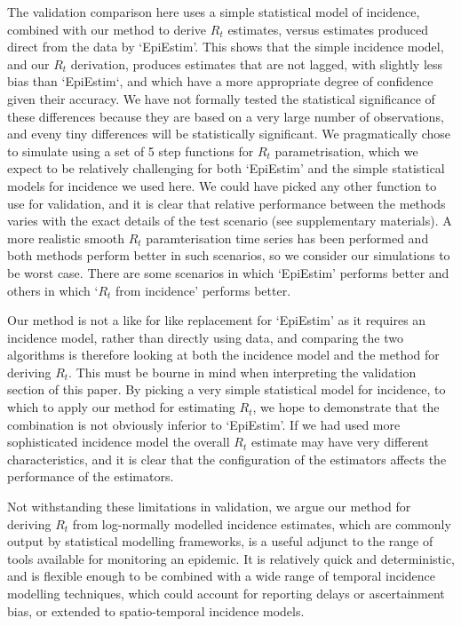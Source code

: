 \documentclass[10pt,letterpaper]{article}
\begin{document}
The validation comparison here uses a simple statistical model of incidence, combined with our method to derive $R_t$ estimates, versus estimates produced direct from the data by `EpiEstim'. This shows that the simple incidence model, and our $R_t$ derivation, produces estimates that are not lagged, with slightly less bias than `EpiEstim`, and which have a more appropriate degree of confidence given their accuracy. We have not formally tested the statistical significance of these differences because they are based on a very large number of observations, and eveny tiny differences will be statistically significant. We pragmatically chose to simulate using a set of 5 step functions for $R_t$ parametrisation, which we expect to be relatively challenging for both `EpiEstim' and the simple statistical models for incidence we used here. We could have picked any other function to use for validation, and it is clear that relative performance between the methods varies with the exact details of the test scenario (see supplementary materials). A more realistic smooth $R_t$ paramterisation time series has been performed and both methods perform better in such scenarios, so we consider our simulations to be worst case. There are some scenarios in which `EpiEstim' performs better and others in which `$R_t$ from incidence' performs better.

Our method is not a like for like replacement for `EpiEstim' as it requires an incidence model, rather than directly using data, and comparing the two algorithms is therefore looking at both the incidence model and the method for deriving $R_t$. This must be bourne in mind when interpreting the validation section of this paper. By picking a very simple statistical model for incidence, to which to apply our method for estimating $R_t$, we hope to demonstrate that the combination is not obviously inferior to `EpiEstim'. If we had used more sophisticated incidence model the overall $R_t$ estimate may have very different characteristics, and it is clear that the configuration of the estimators affects the performance of the estimators.

Not withstanding these limitations in validation, we argue our method for deriving $R_t$ from log-normally modelled incidence estimates, which are commonly output by statistical modelling frameworks, is a useful adjunct to the range of tools available for monitoring an epidemic. It is relatively quick and deterministic, and is flexible enough to be combined with a wide range of temporal incidence modelling techniques, which could account for reporting delays or ascertainment bias, or extended to spatio-temporal incidence models.
\end{document}
